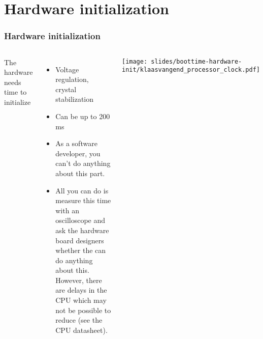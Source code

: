 \section{Hardware initialization}

\begin{frame}
\frametitle{Hardware initialization}
\begin{columns}
The hardware needs time to initialize
\begin{itemize}
\item Voltage regulation, crystal stabilization
\item Can be up to 200 ms
\item As a software developer, you can't do anything about this part.
\item All you can do is measure this time with an oscilloscope and
      ask the hardware board designers whether the can do anything about
      this. However, there are delays in the CPU which may not be
      possible to reduce (see the CPU datasheet).  
\end{itemize}
\texttt{[image: slides/boottime-hardware-init/klaasvangend\_processor\_clock.pdf]}
\end{columns}
\end{frame}

